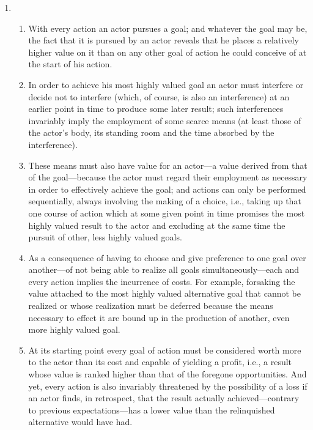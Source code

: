 \documentclass[letterpaper,12pt]{article}
\begin{document}
\begin{enumerate}
\small
\setcounter{enumi}{2}
\item
  \begin{enumerate}
\item With every action an actor pursues a goal; and whatever the goal may be, the fact that it is pursued by an actor reveals that he places a relatively higher value on it than on any other goal of action he could conceive of at the start of his action.

\item In order to achieve his most highly valued goal an actor must interfere or decide not to interfere (which, of course, is also an interference) at an earlier point in time to produce some later result; such interferences invariably imply the employment of some scarce means (at least those of the actor's body, its standing room and the time absorbed by the interference).

\item These means must also have value for an actor---a value derived from that of the goal---because the actor must regard their employment as necessary in order to effectively achieve the goal; and actions can only be performed sequentially, always involving the making of a choice, i.e., taking up that one course of action which at some given point in time promises the most highly valued result to the actor and excluding at the same time the pursuit of other, less highly valued goals.

\item As a consequence of having to choose and give preference to one goal over another---of not being able to realize all goals simultaneously---each and every action implies the incurrence of costs. For example, forsaking the value attached to the most highly valued alternative goal that cannot be realized or whose realization must be deferred because the means necessary to effect it are bound up in the production of another, even more highly valued goal.

\item At its starting point every goal of action must be considered worth more to the actor than its cost and capable of yielding a profit, i.e., a result whose value is ranked higher than that of the foregone opportunities. And yet, every action is also invariably threatened by the possibility of a loss if an actor finds, in retrospect, that the result actually achieved---contrary to previous expectations---has a lower value than the relinquished alternative would have had.
  \end{enumerate}
\end{enumerate}
\end{document}
